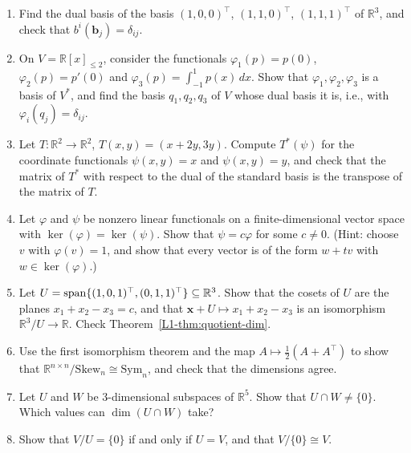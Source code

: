 \begin{enumerate}[leftmargin=*]
\begin{enumerate}
		\item Find the eigenvalues of the difference filter, $(\mathbf{c} \ast \mathbf{x})_j = x_j - x_{j-1}$. Which signals does it map to $\mathbf{0}$?
		\item Show that $\mathrm{circ}(\mathbf{c})$ is invertible if and only if $\hat{c}_m \neq 0$ for all $m$, and that its inverse is again circulant.
	\end{enumerate}
	\item \homework{} Find the dual basis of the basis $(1, 0, 0)^\top$, $(1, 1, 0)^\top$, $(1, 1, 1)^\top$ of $\mathbb{R}^3$, and check that $b^i(\mathbf{b}_j) = \delta_{ij}$.
	\item \homework{} On $V = \mathbb{R}[x]_{\leq 2}$, consider the functionals $\varphi_1(p) = p(0)$, $\varphi_2(p) = p'(0)$ and $\varphi_3(p) = \int_{-1}^1 p(x)\, dx$. Show that $\varphi_1, \varphi_2, \varphi_3$ is a basis of $V^*$, and find the basis $q_1, q_2, q_3$ of $V$ whose dual basis it is, i.e., with $\varphi_i(q_j) = \delta_{ij}$.
	\item \homework{} Let $T: \mathbb{R}^2 \to \mathbb{R}^2$, $T(x, y) = (x + 2y, 3y)$. Compute $T^*(\psi)$ for the coordinate functionals $\psi(x, y) = x$ and $\psi(x, y) = y$, and check that the matrix of $T^*$ with respect to the dual of the standard basis is the transpose of the matrix of $T$.
	\item \homework{} Let $\varphi$ and $\psi$ be nonzero linear functionals on a finite-dimensional vector space with $\ker(\varphi) = \ker(\psi)$. Show that $\psi = c\varphi$ for some $c \neq 0$. (Hint: choose $v$ with $\varphi(v) = 1$, and show that every vector is of the form $w + tv$ with $w \in \ker(\varphi)$.)
	\item \homework{} Let $U = \operatorname{span}\{(1, 0, 1)^\top, (0, 1, 1)^\top\} \subseteq \mathbb{R}^3$. Show that the cosets of $U$ are the planes $x_1 + x_2 - x_3 = c$, and that $\mathbf{x} + U \mapsto x_1 + x_2 - x_3$ is an isomorphism $\mathbb{R}^3/U \to \mathbb{R}$. Check Theorem~\ref{L1-thm:quotient-dim}.
	\item Use the first isomorphism theorem and the map $A \mapsto \frac{1}{2}(A + A^\top)$ to show that $\mathbb{R}^{n \times n}/\mathrm{Skew}_n \cong \mathrm{Sym}_n$, and check that the dimensions agree.
	\item \homework{} Let $U$ and $W$ be $3$-dimensional subspaces of $\mathbb{R}^5$. Show that $U \cap W \neq \{0\}$. Which values can $\dim(U \cap W)$ take?
	\item Show that $V/U = \{0\}$ if and only if $U = V$, and that $V/\{0\} \cong V$.

\end{enumerate}

